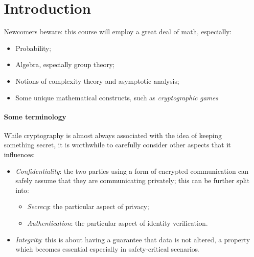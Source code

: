 \documentclass[10pt, a4paper]{report}
\theoremstyle{definition}
\theoremstyle{remark}
\begin{document}
    \tableofcontents

    \chapter{Introduction}

    Newcomers beware: this course will employ a great deal of math, especially:
    \begin{itemize}
        \item Probability;
        \item Algebra, especially group theory;
        \item Notions of complexity theory and asymptotic analysis;
        \item Some unique mathematical constructs, such as \emph{cryptographic games}
    \end{itemize}

    \subsubsection{Some terminology}



    
    While cryptography is almost always associated with the idea of keeping something secret, it is worthwhile to carefully consider other aspects that it influences:

    \begin{itemize}
        \item \emph{Confidentiality}: the two parties using a form of encrypted communication can safely assume that they are communicating privately; this can be further split into:
              \begin{itemize}
                  \item \emph{Secrecy}: the particular aspect of privacy;
                  \item \emph{Authentication}: the particular aspect of identity verification.
              \end{itemize}

        \item \emph{Integrity}: this is about having a guarantee that data is not altered, a property which becomes essential especially in safety-critical scenarios.
    \end{itemize}
\end{document}
